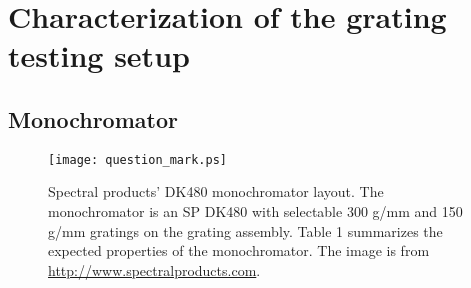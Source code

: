 \chapter{Characterization of the grating testing setup}

\section{Monochromator}

\begin{figure}
\begin{center}
    \texttt{[image: question\_mark.ps]}
  \end{center}
  \caption[DK480 monochromator layout]{Spectral products' DK480 monochromator layout.  The monochromator is an SP DK480 with selectable 300 g/mm and 150 g/mm gratings on the grating assembly.  Table 1 summarizes the expected properties of the monochromator.  The image is from \url{http://www.spectralproducts.com}.}
\end{figure}

